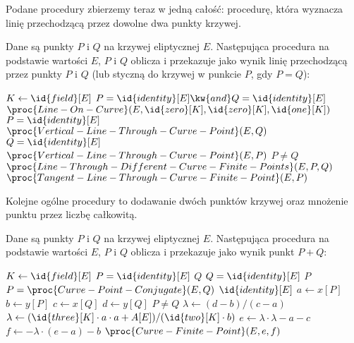 \noindent
Podane procedury zbierzemy teraz w jedną całość:
procedurę, która wyznacza linię przechodzącą przez dowolne dwa punkty krzywej.

\begin{algorithm}
Dane są punkty $P$ i $Q$ na krzywej eliptycznej $E$.
Następująca procedura
na podstawie wartości $E$, $P$ i $Q$
oblicza i przekazuje jako wynik
linię przechodzącą przez punkty $P$ i $Q$
(lub styczną do krzywej w punkcie $P$, gdy $P = Q$):

\begin{codebox}
\li $K \gets \id{field}[E]$
\li \If $P = \id{identity}[E] \kw{ and } Q = \id{identity}[E]$
\li     \Then
            \Return $\proc{Line-On-Curve}(E, \id{zero}[K], \id{zero}[K], \id{one}[K])$
        \End
\li \If $P = \id{identity}[E]$
\li     \Then
            \Return $\proc{Vertical-Line-Through-Curve-Point}(E, Q)$
        \End
\li \If $Q = \id{identity}[E]$
\li     \Then
            \Return $\proc{Vertical-Line-Through-Curve-Point}(E, P)$
        \End
\li \If $P \neq Q$
\li     \Then
            \Return $\proc{Line-Through-Different-Curve-Finite-Points}(E, P, Q)$
\li     \Else
            \Return $\proc{Tangent-Line-Through-Curve-Finite-Point}(E, P)$
        \End
\end{codebox}
\end{algorithm}

\noindent
Kolejne ogólne procedury to dodawanie dwóch punktów krzywej
oraz mnożenie punktu przez liczbę całkowitą.

\begin{algorithm}
Dane są punkty $P$ i $Q$ na krzywej eliptycznej $E$.
Następująca procedura
na podstawie wartości $E$, $P$ i $Q$
oblicza i przekazuje jako wynik
punkt $P + Q$:

\begin{codebox}
\li $K \gets \id{field}[E]$
\li \If $P = \id{identity}[E]$
\li     \Then
            \Return $Q$
        \End
\li \If $Q = \id{identity}[E]$
\li     \Then
            \Return $P$
        \End
\li \If $P = \proc{Curve-Point-Conjugate}(E, Q)$
\li     \Then
            \Return $\id{identity}[E]$
        \End
\li $a \gets x[P]$
\li $b \gets y[P]$
\li $c \gets x[Q]$
\li $d \gets y[Q]$
\li \If $P \neq Q$
\li     \Then
            $\lambda \gets (d - b)/(c - a)$
\li     \Else
            $\lambda \gets (\id{three}[K]\cdot a\cdot a + A[E])/(\id{two}[K]\cdot b)$
        \End
\li $e \gets \lambda\cdot\lambda - a - c$
\li $f \gets -\lambda\cdot(e - a) - b$
\li \Return $\proc{Curve-Finite-Point}(E, e, f)$
\end{codebox}
\end{algorithm}

